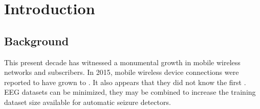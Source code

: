 \chapter{Introduction}\label{Ch:1}		%

\section{Background}\label{sec:GeneralIntroduction1}	
This present decade has witnessed a monumental growth in mobile wireless networks and subscribers. In 2015, mobile wireless device connections were reported to have grown to \cite{brazier1952crosscorrelation}. It also appears that they did not know the first \citep{amigo2015entropy,whedon2016changes}.
EEG datasets can be minimized, they may be combined to increase the training dataset size available for automatic seizure detectors.